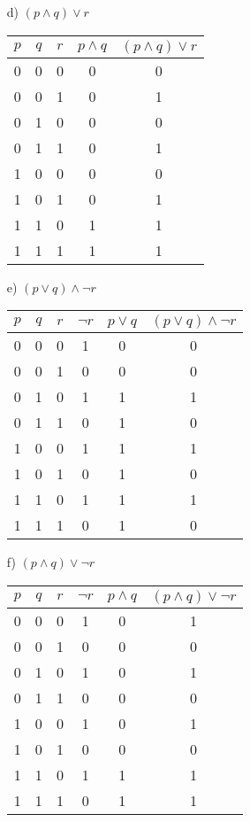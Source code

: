 \documentclass[12pt]{article}
\begin{document}
\begin{itemize}
    \item[d)] $(p \land q) \lor r$

\begin{tabular}{|c|c|c|c|c|}
    \hline
    $p$ & $q$ & $r$ & $p \land q$ & $(p \land q) \lor r$ \\
    \hline
    0 & 0 & 0 & 0 & 0 \\
    0 & 0 & 1 & 0 & 1 \\
    0 & 1 & 0 & 0 & 0 \\
    0 & 1 & 1 & 0 & 1 \\
    1 & 0 & 0 & 0 & 0 \\
    1 & 0 & 1 & 0 & 1 \\
    1 & 1 & 0 & 1 & 1 \\
    1 & 1 & 1 & 1 & 1 \\
    \hline
\end{tabular}

    \item[e)] $(p \lor q) \land \neg r$

\begin{tabular}{|c|c|c|c|c|c|}
    \hline
    $p$ & $q$ & $r$ & $\neg r$ & $p \lor q$ & $(p \lor q) \land \neg r$ \\
    \hline
    0 & 0 & 0 & 1 & 0 & 0 \\
    0 & 0 & 1 & 0 & 0 & 0 \\
    0 & 1 & 0 & 1 & 1 & 1 \\
    0 & 1 & 1 & 0 & 1 & 0 \\
    1 & 0 & 0 & 1 & 1 & 1 \\
    1 & 0 & 1 & 0 & 1 & 0 \\
    1 & 1 & 0 & 1 & 1 & 1 \\
    1 & 1 & 1 & 0 & 1 & 0 \\
    \hline
\end{tabular}

    \item[f)] $(p \land q) \lor \neg r$

\begin{tabular}{|c|c|c|c|c|c|}
    \hline
    $p$ & $q$ & $r$ & $\neg r$ & $p \land q$ & $(p \land q) \lor \neg r$ \\
    \hline
    0 & 0 & 0 & 1 & 0 & 1 \\
    0 & 0 & 1 & 0 & 0 & 0 \\
    0 & 1 & 0 & 1 & 0 & 1 \\
    0 & 1 & 1 & 0 & 0 & 0 \\
    1 & 0 & 0 & 1 & 0 & 1 \\
    1 & 0 & 1 & 0 & 0 & 0 \\
    1 & 1 & 0 & 1 & 1 & 1 \\
    1 & 1 & 1 & 0 & 1 & 1 \\
    \hline
\end{tabular}
\end{itemize}
\end{document}
